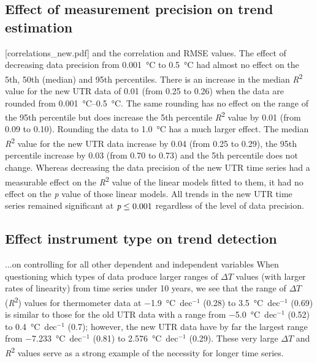 \documentclass{ametsoc}
\begin{document}
\subsection{Effect of measurement precision on trend estimation}
[correlations_new.pdf] and the correlation and RMSE values.
The effect of decreasing data precision from \SI{0.001}{\degreeCelsius} to \SI{0.5}{\degreeCelsius} had almost no effect on the 5th, 50th (median) and 95th percentiles. There is an increase in the median \emph{R}\textsuperscript{2} value for the new UTR data of 0.01 (from 0.25 to 0.26) when the data are rounded from \SIrange{0.001}{0.5}{\degreeCelsius}. The same rounding has no effect on the range of the 95th percentile but does increase the 5th percentile \emph{R}\textsuperscript{2} value by 0.01 (from 0.09 to 0.10). Rounding the data to \SI{1.0}{\degreeCelsius} has a much larger effect. The median \emph{R}\textsuperscript{2} value for the new UTR data increase by 0.04 (from 0.25 to 0.29), the 95th percentile increase by 0.03 (from 0.70 to 0.73) and the 5th percentile does not change. Whereas decreasing the data precision of the new UTR time series had a measurable effect on the \emph{R}\textsuperscript{2} value of the linear models fitted to them, it had no effect on the \emph{p} value of those linear models. All trends in the new UTR time series remained significant at $\emph{p} \leq 0.001$ regardless of the level of data precision.

\subsection{Effect instrument type on trend detection}
...on controlling for all other dependent and independent variables
When questioning which types of data produce larger ranges of $\Delta T$ values (with larger rates of linearity) from time series under 10 years, we see that the range of $\Delta T$ (\emph{R}\textsuperscript{2}) values for thermometer data at \SI{-1.9}{\degreeCelsius}~dec$^{-1}$ (0.28) to \SI{3.5}{\degreeCelsius}~dec$^{-1}$ (0.69) is similar to those for the old UTR data with a range from \SI{-5.0}{\degreeCelsius}~dec$^{-1}$ (0.52) to \SI{0.4}{\degreeCelsius}~dec$^{-1}$ (0.7); however, the new UTR data have by far the largest range from \SI{-7.233}{\degreeCelsius}~dec$^{-1}$ (0.81) to \SI{2.576}{\degreeCelsius}~dec$^{-1}$ (0.29). These very large $\Delta T$ and \emph{R}\textsuperscript{2} values serve as a strong example of the necessity for longer time series.
\end{document}
